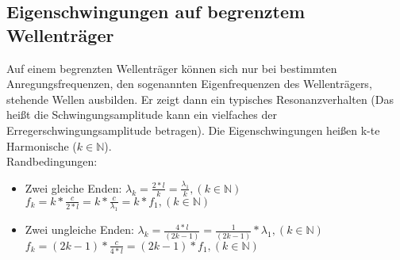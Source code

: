 \subsection{Eigenschwingungen auf begrenztem Wellenträger}
Auf einem begrenzten Wellenträger können sich nur bei bestimmten Anregungsfrequenzen, den sogenannten Eigenfrequenzen des Wellenträgers, stehende Wellen ausbilden. Er zeigt dann ein typisches Resonanzverhalten (Das heißt die Schwingungsamplitude kann ein vielfaches der Erregerschwingungsamplitude betragen). Die Eigenschwingungen heißen k-te Harmonische ($k \in \mathbb{N}$). 
\vspace{2mm} \\
Randbedingungen:
\begin{itemize}
	\item Zwei gleiche Enden: 
	\subitem $ \lambda_{k} = \frac{2 \ast l}{k} = \frac{\lambda_{1}}{k} , (k \in \mathbb{N}) $
	\subitem $ f_{k} = k \ast \frac{c}{2 \ast l} = k \ast \frac{c}{\lambda_{1}} = k \ast f_{1} ,  (k \in \mathbb{N}) $
	
	\item Zwei ungleiche Enden:
	\subitem $ \lambda_{k} = \frac{4 \ast l}{(2k-1)} = \frac{1}{(2k-1)} \ast \lambda_{1} , (k \in \mathbb{N}) $
	\subitem $ f_{k} = (2k-1) \ast \frac{c}{4 \ast l} = (2k-1) \ast f_{1} , (k \in \mathbb{N}) $ 
\end{itemize}